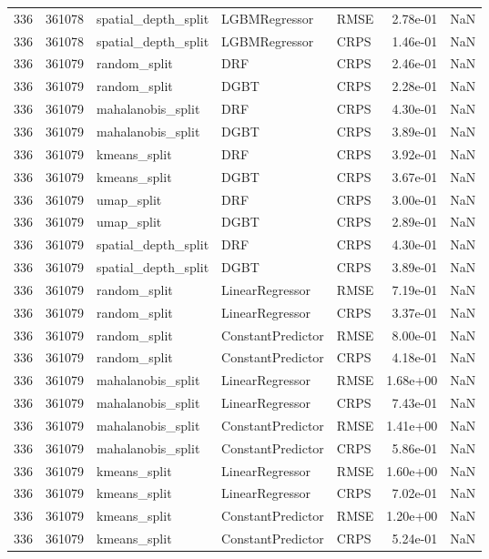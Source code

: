 \begin{tabular}{rrlllrr}
336 & 361078 & spatial\_depth\_split & LGBMRegressor & RMSE & 2.78e-01 & NaN \\
336 & 361078 & spatial\_depth\_split & LGBMRegressor & CRPS & 1.46e-01 & NaN \\
336 & 361079 & random\_split & DRF & CRPS & 2.46e-01 & NaN \\
336 & 361079 & random\_split & DGBT & CRPS & 2.28e-01 & NaN \\
336 & 361079 & mahalanobis\_split & DRF & CRPS & 4.30e-01 & NaN \\
336 & 361079 & mahalanobis\_split & DGBT & CRPS & 3.89e-01 & NaN \\
336 & 361079 & kmeans\_split & DRF & CRPS & 3.92e-01 & NaN \\
336 & 361079 & kmeans\_split & DGBT & CRPS & 3.67e-01 & NaN \\
336 & 361079 & umap\_split & DRF & CRPS & 3.00e-01 & NaN \\
336 & 361079 & umap\_split & DGBT & CRPS & 2.89e-01 & NaN \\
336 & 361079 & spatial\_depth\_split & DRF & CRPS & 4.30e-01 & NaN \\
336 & 361079 & spatial\_depth\_split & DGBT & CRPS & 3.89e-01 & NaN \\
336 & 361079 & random\_split & LinearRegressor & RMSE & 7.19e-01 & NaN \\
336 & 361079 & random\_split & LinearRegressor & CRPS & 3.37e-01 & NaN \\
336 & 361079 & random\_split & ConstantPredictor & RMSE & 8.00e-01 & NaN \\
336 & 361079 & random\_split & ConstantPredictor & CRPS & 4.18e-01 & NaN \\
336 & 361079 & mahalanobis\_split & LinearRegressor & RMSE & 1.68e+00 & NaN \\
336 & 361079 & mahalanobis\_split & LinearRegressor & CRPS & 7.43e-01 & NaN \\
336 & 361079 & mahalanobis\_split & ConstantPredictor & RMSE & 1.41e+00 & NaN \\
336 & 361079 & mahalanobis\_split & ConstantPredictor & CRPS & 5.86e-01 & NaN \\
336 & 361079 & kmeans\_split & LinearRegressor & RMSE & 1.60e+00 & NaN \\
336 & 361079 & kmeans\_split & LinearRegressor & CRPS & 7.02e-01 & NaN \\
336 & 361079 & kmeans\_split & ConstantPredictor & RMSE & 1.20e+00 & NaN \\
336 & 361079 & kmeans\_split & ConstantPredictor & CRPS & 5.24e-01 & NaN \\

\end{tabular}
